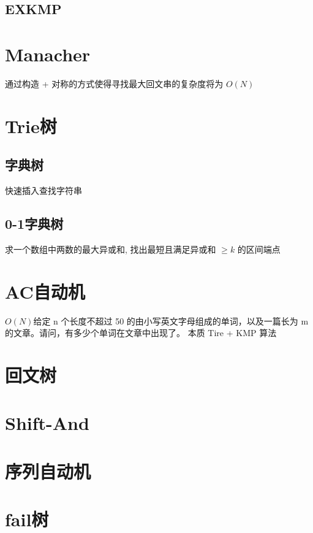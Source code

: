 \documentclass{probook}
\begin{document}
\subsection{EXKMP}
 
\section{Manacher}
通过构造 + 对称的方式使得寻找最大回文串的复杂度将为 $O(N)$
 
\section{Trie树}
\subsection{字典树}
快速插入查找字符串
 
\subsection{0-1字典树}
求一个数组中两数的最大异或和, 找出最短且满足异或和 $\geqslant k$ 的区间端点
 
\section{AC自动机}
$O(N)$给定 n 个长度不超过 50 的由小写英文字母组成的单词，以及一篇长为 m 的文章。请问，有多少个单词在文章中出现了。
本质 Tire + KMP 算法
 
\section{回文树}
 
\section{Shift-And}
 
\section{序列自动机}
 
\section{fail树} 
 
\end{document}

